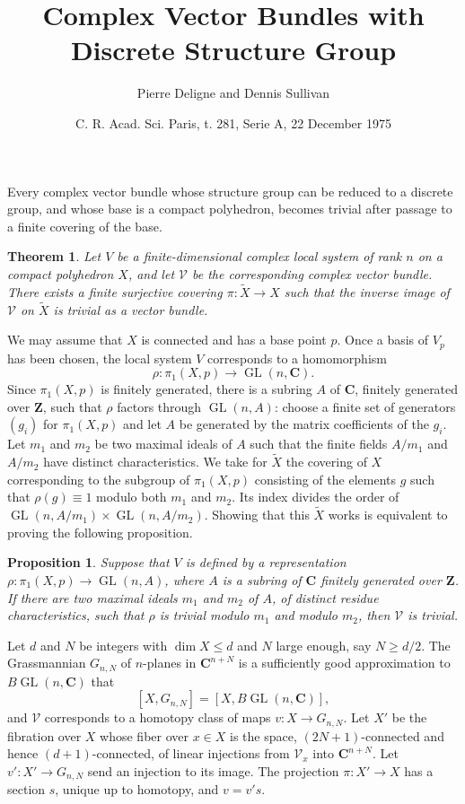 \documentclass[11pt]{amsart}
\theoremstyle{plain}
\newtheorem*{theorem*}{Theorem}
\newtheorem*{proposition*}{Proposition}
\theoremstyle{definition}
\theoremstyle{remark}
\DeclareMathOperator{\GL}{GL}
\providecommand{\Z}{\mathbf Z}
\providecommand{\C}{\mathbf C}
\begin{document}
\title{Complex Vector Bundles with Discrete Structure Group}
\author{Pierre Deligne and Dennis Sullivan}
\date{C. R. Acad. Sci. Paris, t. 281, Serie A, 22 December 1975}
\maketitle

Every complex vector bundle whose structure group can be reduced to a discrete group, and whose base is a compact polyhedron, becomes trivial after passage to a finite covering of the base.

\begin{theorem*}
Let $V$ be a finite-dimensional complex local system of rank $n$ on a compact polyhedron $X$, and let $\mathscr V$ be the corresponding complex vector bundle. There exists a finite surjective covering $\pi:\widetilde X\to X$ such that the inverse image of $\mathscr V$ on $\widetilde X$ is trivial as a vector bundle.
\end{theorem*}

We may assume that $X$ is connected and has a base point $p$. Once a basis of $V_p$ has been chosen, the local system $V$ corresponds to a homomorphism
\[
\rho:\pi_1(X,p)\to \GL(n,\C).
\]
Since $\pi_1(X,p)$ is finitely generated, there is a subring $A$ of $\C$, finitely generated over $\Z$, such that $\rho$ factors through $\GL(n,A)$: choose a finite set of generators $(g_i)$ for $\pi_1(X,p)$ and let $A$ be generated by the matrix coefficients of the $g_i$. Let $m_1$ and $m_2$ be two maximal ideals of $A$ such that the finite fields $A/m_1$ and $A/m_2$ have distinct characteristics. We take for $\widetilde X$ the covering of $X$ corresponding to the subgroup of $\pi_1(X,p)$ consisting of the elements $g$ such that $\rho(g)\equiv1$ modulo both $m_1$ and $m_2$. Its index divides the order of $\GL(n,A/m_1)\times\GL(n,A/m_2)$. Showing that this $\widetilde X$ works is equivalent to proving the following proposition.

\begin{proposition*}
Suppose that $V$ is defined by a representation $\rho:\pi_1(X,p)\to\GL(n,A)$, where $A$ is a subring of $\C$ finitely generated over $\Z$. If there are two maximal ideals $m_1$ and $m_2$ of $A$, of distinct residue characteristics, such that $\rho$ is trivial modulo $m_1$ and modulo $m_2$, then $\mathscr V$ is trivial.
\end{proposition*}

Let $d$ and $N$ be integers with $\dim X\le d$ and $N$ large enough, say $N\ge d/2$. The Grassmannian $G_{n,N}$ of $n$-planes in $\C^{n+N}$ is a sufficiently good approximation to $B\GL(n,\C)$ that
\[
[X,G_{n,N}]=[X,B\GL(n,\C)],
\]
and $\mathscr V$ corresponds to a homotopy class of maps $v:X\to G_{n,N}$. Let $X'$ be the fibration over $X$ whose fiber over $x\in X$ is the space, $(2N+1)$-connected and hence $(d+1)$-connected, of linear injections from $\mathscr V_x$ into $\C^{n+N}$. Let $v':X'\to G_{n,N}$ send an injection to its image. The projection $\pi:X'\to X$ has a section $s$, unique up to homotopy, and $v=v's$.
\end{document}
